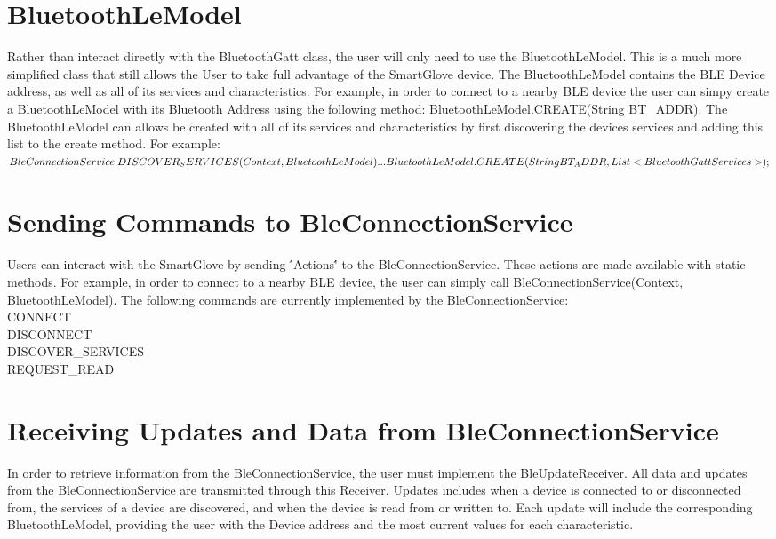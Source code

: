 \documentclass{scrreprt}
\begin{document}
\section{BluetoothLeModel}
Rather than interact directly with the BluetoothGatt class, the user will only need to
use the BluetoothLeModel. This is a much more simplified class that still allows the 
User to take full advantage of the SmartGlove device. The BluetoothLeModel
contains the BLE Device address, as well as all of its services and characteristics.
For example, in order to connect to a nearby BLE device the user can simpy
create a BluetoothLeModel with its Bluetooth Address using the following 
method: BluetoothLeModel.CREATE(String BT_ADDR). The BluetoothLeModel
can allows be created with all of its services and characteristics by first discovering the
devices services and adding this list to the create method. For example:\\
$BleConnectionService.DISCOVER_SERVICES(Context, BluetoothLeModel)\\
...\\
BluetoothLeModel.CREATE(String BT_ADDR, List<BluetoothGattServices>);$\\

\section{Sending Commands to BleConnectionService}
Users can interact with the SmartGlove by sending \''Actions\'' to the
BleConnectionService. These actions are made available with static methods.
For example, in order to connect to a nearby BLE device, the user can simply
call BleConnectionService(Context, BluetoothLeModel). The following commands
are currently implemented by the BleConnectionService:\\
CONNECT\\
DISCONNECT\\
DISCOVER_SERVICES\\
REQUEST_READ\\

\section{Receiving Updates and Data from BleConnectionService}
In order to retrieve information from the BleConnectionService, the user must implement
the BleUpdateReceiver. All data and updates from the BleConnectionService are transmitted
through this Receiver. Updates includes when a device is connected to or disconnected from,
the services of a device are discovered, and when the device is read from or written to.
Each update will include the corresponding BluetoothLeModel, providing the user
with the Device address and the most current values for each characteristic.
\end{document}

